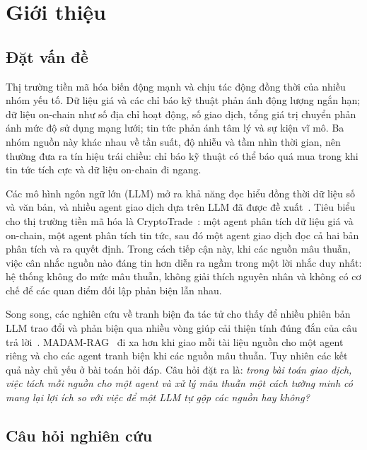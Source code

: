 \chapter{Giới thiệu}
\label{chap:intro}

\section{Đặt vấn đề}

Thị trường tiền mã hóa biến động mạnh và chịu tác động đồng thời của nhiều nhóm yếu tố. Dữ liệu giá và các chỉ báo
kỹ thuật phản ánh động lượng ngắn hạn; dữ liệu on-chain như số địa chỉ hoạt động, số giao dịch, tổng giá trị chuyển
phản ánh mức độ sử dụng mạng lưới; tin tức phản ánh tâm lý và sự kiện vĩ mô. Ba nhóm nguồn này khác nhau về tần suất,
độ nhiễu và tầm nhìn thời gian, nên thường đưa ra tín hiệu trái chiều: chỉ báo kỹ thuật có thể báo quá mua trong khi
tin tức tích cực và dữ liệu on-chain đi ngang.

Các mô hình ngôn ngữ lớn (LLM) mở ra khả năng đọc hiểu đồng thời dữ liệu số và văn bản, và nhiều agent giao dịch dựa
trên LLM đã được đề xuất~\cite{yu2023finmem,yu2024fincon,xiao2024tradingagents,li2024cryptotrade}. Tiêu biểu cho thị
trường tiền mã hóa là CryptoTrade~\cite{li2024cryptotrade}: một agent phân tích dữ liệu giá và on-chain, một agent
phân tích tin tức, sau đó một agent giao dịch đọc cả hai bản phân tích và ra quyết định. Trong cách tiếp cận này, khi
các nguồn mâu thuẫn, việc cân nhắc nguồn nào đáng tin hơn diễn ra ngầm trong một lời nhắc duy nhất: hệ thống không đo
mức mâu thuẫn, không giải thích nguyên nhân và không có cơ chế để các quan điểm đối lập phản biện lẫn nhau.

Song song, các nghiên cứu về tranh biện đa tác tử cho thấy để nhiều phiên bản LLM trao đổi và phản biện qua nhiều vòng
giúp cải thiện tính đúng đắn của câu trả lời~\cite{du2024debate,liang2024divergent}. MADAM-RAG~\cite{wang2025madamrag}
đi xa hơn khi giao mỗi tài liệu nguồn cho một agent riêng và cho các agent tranh biện khi các nguồn mâu thuẫn. Tuy
nhiên các kết quả này chủ yếu ở bài toán hỏi đáp. Câu hỏi đặt ra là: \emph{trong bài toán giao dịch, việc tách mỗi
nguồn cho một agent và xử lý mâu thuẫn một cách tường minh có mang lại lợi ích so với việc để một LLM tự gộp các nguồn
hay không?}

\section{Câu hỏi nghiên cứu}

